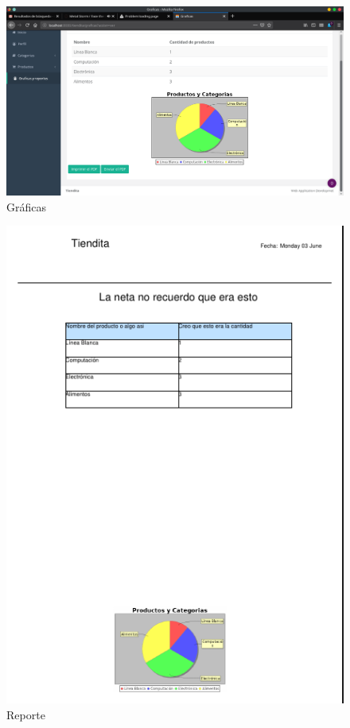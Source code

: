 \documentclass[a4paper,12pt]{article}
\begin{document}
\begin{figure}[H]
\begin{center}
 \includegraphics[width=\textwidth]{graficas.png}
 \caption{Gráficas}
 \label{fig:graficas}
\end{center}
\end{figure}

\begin{figure}[H]
\begin{center}
 \includegraphics[width=\textwidth]{reporte.png}
 \caption{Reporte}
 \label{fig:reporte}
\end{center}
\end{figure}
\end{document}
